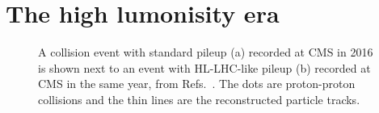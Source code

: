 \clearpage

\section{The high lumonisity era}

\begin{figure}[!htb]
    \centering
    \qquad
    \caption{
        A collision event with standard pileup (a) recorded at CMS in 2016 is shown next to an event with HL-LHC-like pileup (b) recorded at CMS in the same year, from Refs.~\cite{NormalPU2016, HighPU2016}.
        The dots are proton-proton collisions and the thin lines are the reconstructed particle tracks.
    }
    \label{fig:pileup}
\end{figure}

